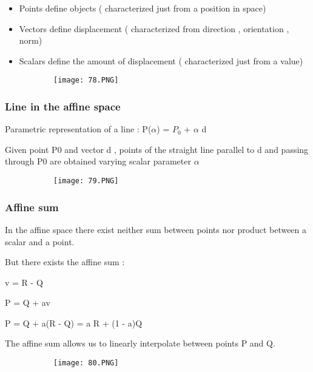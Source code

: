 \documentclass{article}
\begin{document}
\begin{itemize}
    \item Points define objects ( characterized just from a position in space)
    \item Vectors define displacement ( characterized from direction , orientation , norm)
    \item Scalars define the amount of displacement ( characterized just from a value)
\end{itemize}


\begin{figure}[ht!]
  \centering
  \begin{subfigure}[b]{0.7\linewidth}
    \texttt{[image: 78.PNG]}
  \end{subfigure}
\end{figure} 

\subsubsection{Line in the affine space}


Parametric representation of a line : P($\alpha$) = $P_0$ + $\alpha$ d

Given point P0 and vector d , points of the straight line parallel to d and passing through P0 are obtained varying scalar parameter $\alpha$

\begin{figure}[ht!]
  \centering
  \begin{subfigure}[b]{0.2\linewidth}
    \texttt{[image: 79.PNG]}
  \end{subfigure}
\end{figure}

\subsubsection{Affine sum}

In the affine space there exist neither sum between points nor product between a scalar and a point.

But there exists the affine sum : 

v = R - Q 

P = Q + av

P = Q + a(R - Q) = a R + (1 - a)Q

The affine sum allows us to linearly interpolate between points P and Q.


\begin{figure}[ht!]
  \centering
  \begin{subfigure}[b]{0.2\linewidth}
    \texttt{[image: 80.PNG]}
  \end{subfigure}
\end{figure}
\end{document}
